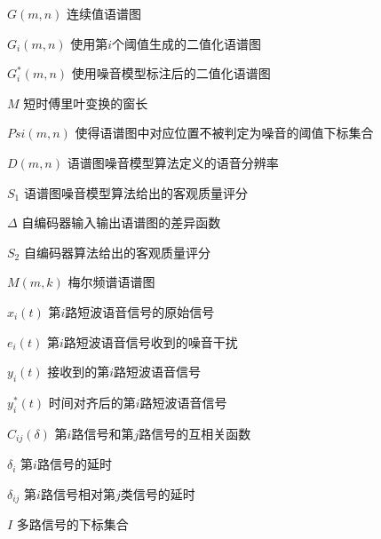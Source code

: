 
\begin{denotation}[3cm]
\item[$G(m,n)$]  连续值语谱图
\item[$G_i(m,n)$]  使用第$i$个阈值生成的二值化语谱图
\item[$G_i^*(m,n)$]  使用噪音模型标注后的二值化语谱图
\item[$M$]  短时傅里叶变换的窗长
\item[$Psi(m,n)$]  使得语谱图中对应位置不被判定为噪音的阈值下标集合
\item[$D(m,n)$]  语谱图噪音模型算法定义的语音分辨率
\item[$S_1$] 语谱图噪音模型算法给出的客观质量评分
\item[$\Delta$] 自编码器输入输出语谱图的差异函数
\item[$S_2$]    自编码器算法给出的客观质量评分
\item[$M(m,k)$]   梅尔频谱语谱图
\item[$x_i(t)$] 第$i$路短波语音信号的原始信号
\item[$e_i(t)$] 第$i$路短波语音信号收到的噪音干扰
\item[$y_i(t)$] 接收到的第$i$路短波语音信号
\item[$y_i^*(t)$] 时间对齐后的第$i$路短波语音信号
\item[$C_{ij}(\delta)$] 第$i$路信号和第$j$路信号的互相关函数
\item[$\delta_i$] 第$i$路信号的延时
\item[$\delta_{ij}$]  第$i$路信号相对第$j$类信号的延时
\item[$I$] 多路信号的下标集合
\end{denotation}
